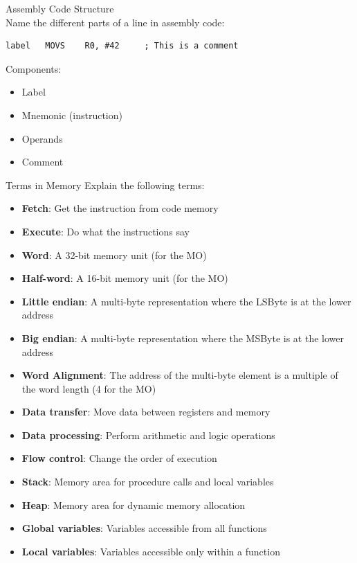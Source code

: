 \begin{example2}{Assembly Code Structure}\\
Name the different parts of a line in assembly code:
\begin{lstlisting}[language=armasm, style=basesmol]
label   MOVS    R0, #42     ; This is a comment
\end{lstlisting}
Components:
\begin{itemize}
  \item Label
  \item Mnemonic (instruction)
  \item Operands
  \item Comment
\end{itemize}
\end{example2}

\begin{example2}{Terms in Memory}
Explain the following terms:
\begin{itemize}
  \item \textbf{Fetch}: Get the instruction from code memory
  \item \textbf{Execute}: Do what the instructions say
  \item \textbf{Word}: A 32-bit memory unit (for the MO)
  \item \textbf{Half-word}: A 16-bit memory unit (for the MO)
  \item \textbf{Little endian}: A multi-byte representation where the LSByte is at the lower address
  \item \textbf{Big endian}: A multi-byte representation where the MSByte is at the lower address
  \item \textbf{Word Alignment}: The address of the multi-byte element is a multiple of the word length (4 for the MO)
  \item \textbf{Data transfer}: Move data between registers and memory
  \item \textbf{Data processing}: Perform arithmetic and logic operations
  \item \textbf{Flow control}: Change the order of execution
  \item \textbf{Stack}: Memory area for procedure calls and local variables
  \item \textbf{Heap}: Memory area for dynamic memory allocation
  \item \textbf{Global variables}: Variables accessible from all functions
  \item \textbf{Local variables}: Variables accessible only within a function

\end{itemize}
\end{example2}
